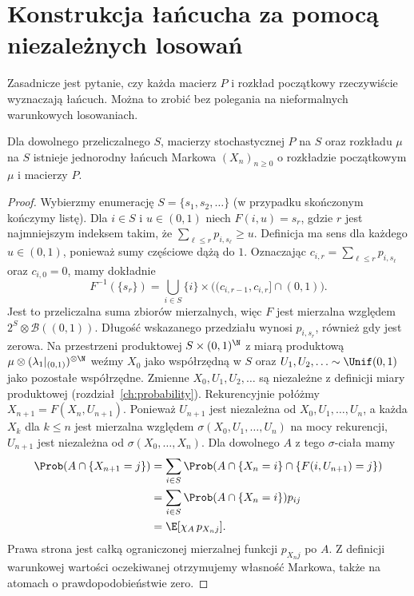 \section{Konstrukcja łańcucha za pomocą niezależnych losowań}

Zasadnicze jest pytanie, czy każda macierz $P$ i rozkład
początkowy rzeczywiście wyznaczają łańcuch. Można to
zrobić bez polegania na nieformalnych warunkowych
losowaniach.

\begin{twierdzenie}
Dla dowolnego przeliczalnego $S$, macierzy stochastycznej
$P$ na $S$ oraz rozkładu $\mu$ na $S$ istnieje
jednorodny łańcuch Markowa $(X_n)_{n\geq0}$
o rozkładzie początkowym $\mu$ i macierzy $P$.
\end{twierdzenie}
\begin{proof}
Wybierzmy enumerację $S=\{s_1,s_2,\ldots\}$
(w przypadku skończonym kończymy listę).
Dla $i\in S$ i $u\in(0,1)$ niech $F(i,u)=s_r$,
gdzie $r$ jest najmniejszym indeksem takim, że
$\sum_{\ell\leq r}p_{i,s_\ell}\geq u$.
Definicja ma sens dla każdego $u\in(0,1)$, ponieważ
sumy częściowe dążą do $1$. Oznaczając
$c_{i,r}=\sum_{\ell\leq r}p_{i,s_\ell}$ oraz
$c_{i,0}=0$, mamy dokładnie
\[
F^{-1}(\{s_r\})=
\bigcup_{i\in S}\{i\}\times
\bigl((c_{i,r-1},c_{i,r}]\cap(0,1)\bigr).
\]
Jest to przeliczalna suma zbiorów mierzalnych,
więc $F$ jest mierzalna względem
$2^S\otimes\mathcal B((0,1))$. Długość wskazanego
przedziału wynosi $p_{i,s_r}$, również gdy jest zerowa.
Na przestrzeni produktowej
$S\times(0,1)^{\N}$ z miarą produktową
$\mu\otimes(\lambda_1|_{(0,1)})^{\otimes\N}$
weźmy $X_0$ jako współrzędną w $S$ oraz
$U_1,U_2,\ldots\sim\Unif(0,1)$ jako pozostałe
współrzędne. Zmienne $X_0,U_1,U_2,\ldots$ są niezależne
z definicji miary produktowej
(rozdział~\ref{ch:probability}).
Rekurencyjnie połóżmy
$X_{n+1}=F(X_n,U_{n+1})$. Ponieważ
$U_{n+1}$ jest niezależna od $X_0,U_1,\ldots,U_n$,
a każda $X_k$ dla $k\leq n$ jest mierzalna względem
$\sigma(X_0,U_1,\ldots,U_n)$ na mocy rekurencji,
$U_{n+1}$ jest niezależna od $\sigma(X_0,\ldots,X_n)$.
Dla dowolnego $A$ z tego $\sigma$-ciała mamy
\begin{align*}
\Prob(A\cap\{X_{n+1}=j\})
&=\sum_{i\in S}\Prob(A\cap\{X_n=i\}
                      \cap\{F(i,U_{n+1})=j\})\\
&=\sum_{i\in S}\Prob(A\cap\{X_n=i\})p_{ij}\\
&=\E[\chi_A\,p_{X_nj}].
\end{align*}
Prawa strona jest całką ograniczonej mierzalnej
funkcji $p_{X_nj}$ po $A$. Z definicji warunkowej
wartości oczekiwanej otrzymujemy własność Markowa,
także na atomach o prawdopodobieństwie zero.
\end{proof}

